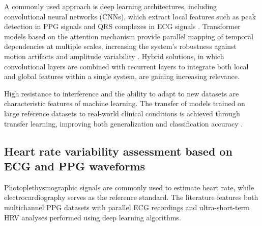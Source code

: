 \documentclass{citask}
\begin{document}
A commonly used approach is deep learning architectures, including convolutional neural networks (CNNs), which extract local features such as peak detection in PPG signals and QRS complexes in ECG signals \cite{14}. Transformer models based on the attention mechanism provide parallel mapping of temporal dependencies at multiple scales, increasing the system's robustness against motion artifacts and amplitude variability \cite{15}. Hybrid solutions, in which convolutional layers are combined with recurrent layers to integrate both local and global features within a single system, are gaining increasing relevance.


High resistance to interference and the ability to adapt to new datasets are characteristic features of machine learning. The transfer of models trained on large reference datasets to real-world clinical conditions is achieved through transfer learning, improving both generalization and classification accuracy \cite{16}.

\subsection{Heart rate variability assessment based on ECG and PPG waveforms}
Photoplethysmographic signals are commonly used to estimate heart rate, while electrocardiography serves as the reference standard. The literature features both multichannel PPG datasets with parallel ECG recordings and ultra-short-term HRV analyses performed using deep learning algorithms.
\end{document}
